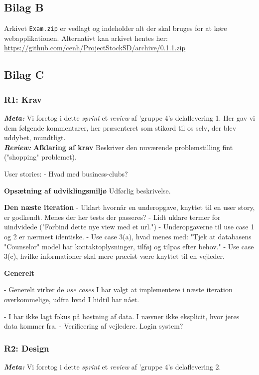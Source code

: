 \documentclass[12pt]{article}
\begin{document}
\subsection{Bilag B}
\label{sec:bilagB}
Arkivet \texttt{Exam.zip} er vedlagt og indeholder alt der skal bruges for at køre webapplikationen.
Alternativt kan arkivet hentes her:\\
\url{https://github.com/cenh/ProjectStockSD/archive/0.1.1.zip}


\subsection{Bilag C}
\label{sec:bilagC}
\subsubsection{R1: Krav}
\textit{\textbf{Meta:}} Vi foretog i dette \textit{sprint} et \textit{review} af 'gruppe 4's delaflevering 1. Her gav vi dem følgende kommentarer, her præsenteret som stikord til os selv, der blev uddybet, mundtligt. \\

\textit{\textbf{Review:}} \textbf{Afklaring af krav}
Beskriver den nuværende problemstilling fint ("shopping" problemet).

User stories:
- Hvad med business-clubs?

\textbf{Opsætning af udviklingsmiljø}
Udførlig beskrivelse.

\textbf{Den næste iteration}
- Uklart hvornår en underopgave, knyttet til en user story, er godkendt. Menes der her tests der passeres?
- Lidt uklare termer for uindvidede ("Forbind dette nye view med et url.")
- Underopgaverne til use case 1 og 2 er nærmest identiske.
- Use case 3(a), hvad menes med: "Tjek at databasens "Counselor" model har kontaktoplysninger, tilføj og tilpas efter behov."
- Use case 3(c), hvilke informationer skal mere præcist være knyttet til en vejleder.

\textbf{Generelt}

- Generelt virker de \textit{use cases} I har valgt at implementere i næste iteration overkommelige, udfra hvad I hidtil har nået.

- I har ikke lagt fokus på høstning af data. I nævner ikke eksplicit, hvor jeres data kommer fra.
- Verificering af vejledere. Login system?



\subsubsection{R2: Design}
\textit{\textbf{Meta:}} Vi foretog i dette \textit{sprint} et \textit{review} af 'gruppe 4's delaflevering 2.\\
\end{document}
